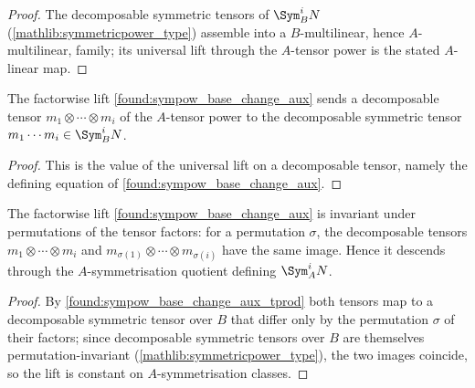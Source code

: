\begin{proof}
  \leanok
  The decomposable symmetric tensors of \(\Sym^i_B N\)
  (\cref{mathlib:symmetricpower_type}) assemble into a \(B\)-multilinear, hence
  \(A\)-multilinear, family; its universal lift through the \(A\)-tensor power is
  the stated \(A\)-linear map.
\end{proof}

\begin{lemma}
  \label{found:sympow_base_change_aux_tprod}
  The factorwise lift \cref{found:sympow_base_change_aux} sends a decomposable
  tensor \(m_1\otimes\cdots\otimes m_i\) of the \(A\)-tensor power to the
  decomposable symmetric tensor \(m_1\cdots m_i\in\Sym^i_B N\).
\end{lemma}

\begin{proof}
  \leanok
  This is the value of the universal lift on a decomposable tensor, namely the
  defining equation of \cref{found:sympow_base_change_aux}.
\end{proof}

\begin{lemma}
  \label{found:sympow_base_change_aux_respects}
  The factorwise lift \cref{found:sympow_base_change_aux} is invariant under
  permutations of the tensor factors: for a permutation \(\sigma\), the
  decomposable tensors \(m_1\otimes\cdots\otimes m_i\) and
  \(m_{\sigma(1)}\otimes\cdots\otimes m_{\sigma(i)}\) have the same image.  Hence
  it descends through the \(A\)-symmetrisation quotient defining \(\Sym^i_A N\).
\end{lemma}

\begin{proof}
  \leanok
  By \cref{found:sympow_base_change_aux_tprod} both tensors map to a decomposable
  symmetric tensor over \(B\) that differ only by the permutation \(\sigma\) of
  their factors; since decomposable symmetric tensors over \(B\) are themselves
  permutation-invariant (\cref{mathlib:symmetricpower_type}), the two images
  coincide, so the lift is constant on \(A\)-symmetrisation classes.
\end{proof}

